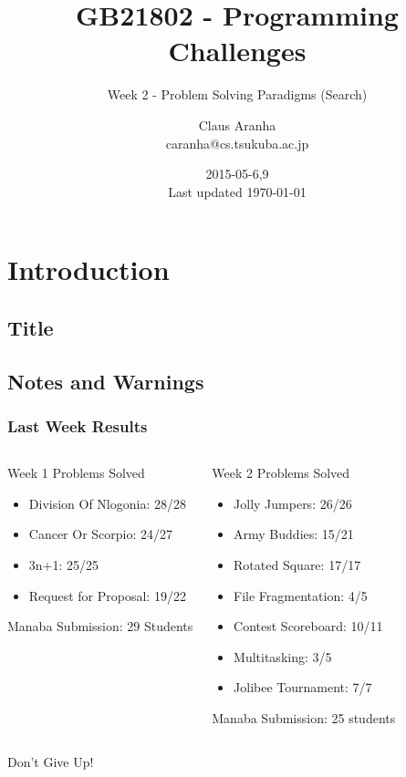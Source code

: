 \documentclass{beamer}
\title[GB21802]{GB21802 - Programming Challenges}
\subtitle[]{Week 2 - Problem Solving Paradigms (Search)}
\author[Claus Aranha]{Claus Aranha\\{\footnotesize caranha@cs.tsukuba.ac.jp}}
\institute{College of Information Science}
\date{2015-05-6,9\\{\tiny Last updated \today}}
\begin{document}
\section{Introduction}
\subsection{Title}
\begin{frame}
\maketitle
\end{frame}

\subsection{Notes and Warnings}

\begin{frame}
  \frametitle{Last Week Results}
  {\smaller
    \begin{columns}[T]
      \begin{block}{Week 1}
        Problems Solved\\
        \begin{itemize}
        \item Division Of Nlogonia: 28/28
        \item Cancer Or Scorpio: 24/27
        \item 3n+1: 25/25
        \item Request for Proposal: 19/22
        \end{itemize}

        \medskip

        Manaba Submission: 29 Students
      \end{block}
      \begin{block}{Week 2}
        Problems Solved\\
        \begin{itemize}
          \item Jolly Jumpers: 26/26
          \item Army Buddies: 15/21
          \item Rotated Square: 17/17
          \item File Fragmentation: 4/5
          \item Contest Scoreboard: 10/11
          \item Multitasking: 3/5
          \item Jolibee Tournament: 7/7
        \end{itemize}

        \medskip

        Manaba Submission: 25 students
      \end{block}
    \end{columns}
  }

  \begin{center}
    Don't Give Up!
  \end{center}
\end{frame}
\end{document}
